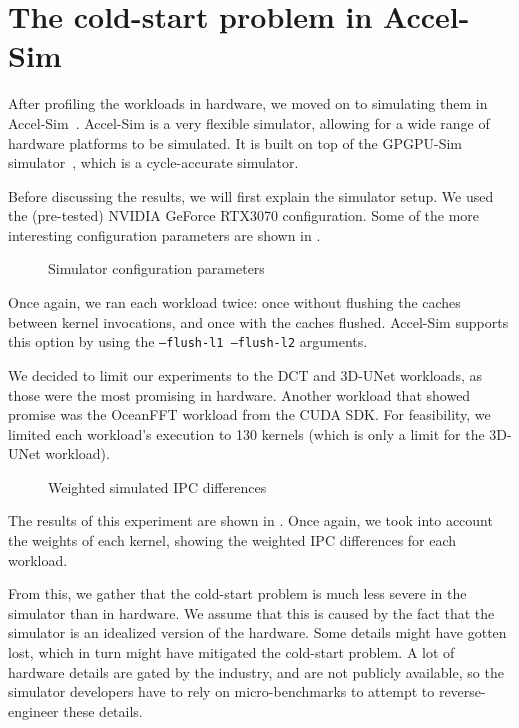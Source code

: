 \documentclass[5p,numvwe]{elsarticle}
\begin{document}
    \section{The cold-start problem in Accel-Sim}\label{sec:sim}
    After profiling the workloads in hardware, we moved on to simulating them in Accel-Sim~\cite{accelsim}.
    Accel-Sim is a very flexible simulator, allowing for a wide range of hardware platforms to be simulated.
    It is built on top of the GPGPU-Sim simulator~\cite{gpgpu-sim}, which is a cycle-accurate simulator.

    Before discussing the results, we will first explain the simulator setup.
    We used the (pre-tested) NVIDIA GeForce RTX3070 configuration.
    Some of the more interesting configuration parameters are shown in .

    \begin{figure}[h]
        \centering
        \caption{Simulator configuration parameters}
        \label{fig:config-sim}
    \end{figure}

    Once again, we ran each workload twice: once without flushing the caches between kernel invocations, and once with the caches flushed.
    Accel-Sim supports this option by using the \texttt{--flush-l1 --flush-l2} arguments.

    We decided to limit our experiments to the DCT and 3D-UNet workloads, as those were the most promising in hardware.
    Another workload that showed promise was the OceanFFT workload from the CUDA SDK\@.
    For feasibility, we limited each workload's execution to 130 kernels (which is only a limit for the 3D-UNet workload).

    \begin{figure}[hb]
        \centering
        \caption{Weighted simulated IPC differences}
        \label{fig:w-sim-ipc}
    \end{figure}

    The results of this experiment are shown in .
    Once again, we took into account the weights of each kernel, showing the weighted IPC differences for each workload.

    From this, we gather that the cold-start problem is much less severe in the simulator than in hardware.
    We assume that this is caused by the fact that the simulator is an idealized version of the hardware.
    Some details might have gotten lost, which in turn might have mitigated the cold-start problem.
    A lot of hardware details are gated by the industry, and are not publicly available, so the simulator developers have to rely on micro-benchmarks to attempt to reverse-engineer these details.
\end{document}
